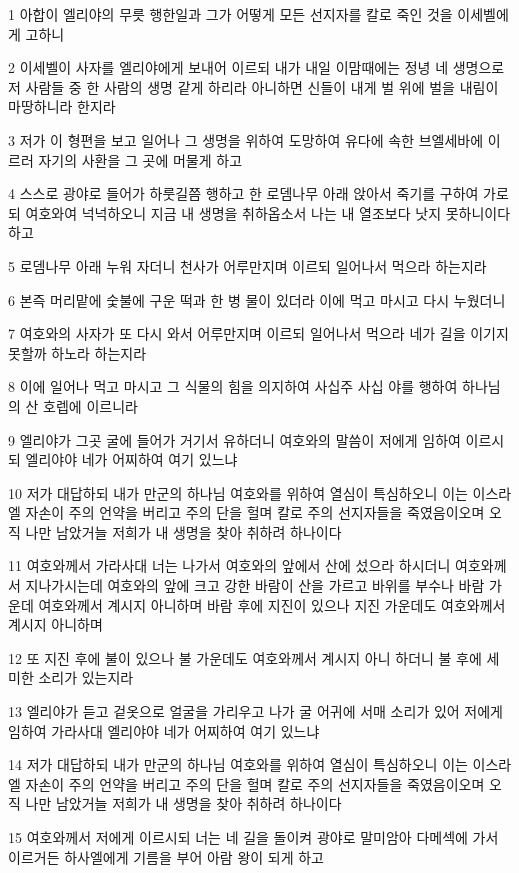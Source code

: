 \par 1 아합이 엘리야의 무릇 행한일과 그가 어떻게 모든 선지자를 칼로 죽인 것을 이세벨에게 고하니
\par 2 이세벨이 사자를 엘리야에게 보내어 이르되 내가 내일 이맘때에는 정녕 네 생명으로 저 사람들 중 한 사람의 생명 같게 하리라 아니하면 신들이 내게 벌 위에 벌을 내림이 마땅하니라 한지라
\par 3 저가 이 형편을 보고 일어나 그 생명을 위하여 도망하여 유다에 속한 브엘세바에 이르러 자기의 사환을 그 곳에 머물게 하고
\par 4 스스로 광야로 들어가 하룻길쯤 행하고 한 로뎀나무 아래 앉아서 죽기를 구하여 가로되 여호와여 넉넉하오니 지금 내 생명을 취하옵소서 나는 내 열조보다 낫지 못하니이다 하고
\par 5 로뎀나무 아래 누워 자더니 천사가 어루만지며 이르되 일어나서 먹으라 하는지라
\par 6 본즉 머리맡에 숯불에 구운 떡과 한 병 물이 있더라 이에 먹고 마시고 다시 누웠더니
\par 7 여호와의 사자가 또 다시 와서 어루만지며 이르되 일어나서 먹으라 네가 길을 이기지 못할까 하노라 하는지라
\par 8 이에 일어나 먹고 마시고 그 식물의 힘을 의지하여 사십주 사십 야를 행하여 하나님의 산 호렙에 이르니라
\par 9 엘리야가 그곳 굴에 들어가 거기서 유하더니 여호와의 말씀이 저에게 임하여 이르시되 엘리야야 네가 어찌하여 여기 있느냐
\par 10 저가 대답하되 내가 만군의 하나님 여호와를 위하여 열심이 특심하오니 이는 이스라엘 자손이 주의 언약을 버리고 주의 단을 헐며 칼로 주의 선지자들을 죽였음이오며 오직 나만 남았거늘 저희가 내 생명을 찾아 취하려 하나이다
\par 11 여호와께서 가라사대 너는 나가서 여호와의 앞에서 산에 섰으라 하시더니 여호와께서 지나가시는데 여호와의 앞에 크고 강한 바람이 산을 가르고 바위를 부수나 바람 가운데 여호와께서 계시지 아니하며 바람 후에 지진이 있으나 지진 가운데도 여호와께서 계시지 아니하며
\par 12 또 지진 후에 불이 있으나 불 가운데도 여호와께서 계시지 아니 하더니 불 후에 세미한 소리가 있는지라
\par 13 엘리야가 듣고 겉옷으로 얼굴을 가리우고 나가 굴 어귀에 서매 소리가 있어 저에게 임하여 가라사대 엘리야야 네가 어찌하여 여기 있느냐
\par 14 저가 대답하되 내가 만군의 하나님 여호와를 위하여 열심이 특심하오니 이는 이스라엘 자손이 주의 언약을 버리고 주의 단을 헐며 칼로 주의 선지자들을 죽였음이오며 오직 나만 남았거늘 저희가 내 생명을 찾아 취하려 하나이다
\par 15 여호와께서 저에게 이르시되 너는 네 길을 돌이켜 광야로 말미암아 다메섹에 가서 이르거든 하사엘에게 기름을 부어 아람 왕이 되게 하고
